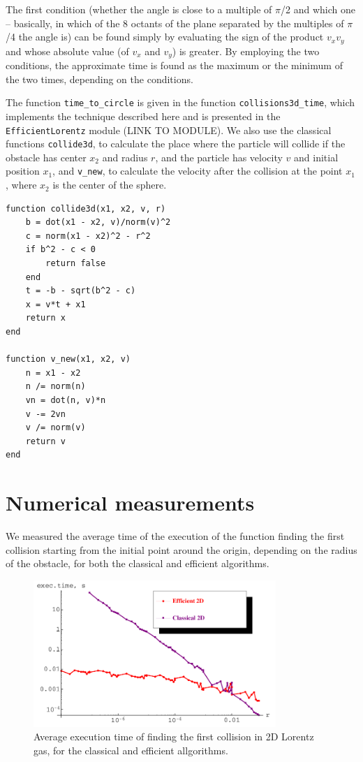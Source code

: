 \documentclass[prl,amsmath,amssymb, twocolumn, showpacs]{revtex4-1}
\begin{document}
The first condition (whether the angle is close to a multiple of $\pi$/2 and which one – basically, in which of the 8 octants of the plane separated by the multiples of $\pi$/4 the angle is) can be found simply by evaluating the sign of the product $v_x v_y$ and whose absolute value (of $v_x$ and $v_y$) is greater. By employing the two conditions, the approximate time is found as the maximum or the minimum of the two times, depending on the conditions.

The function \texttt{time\_to\_circle} is given in the function \texttt{collisions3d\_time}, which implements the technique described here and is presented in the \texttt{EfficientLorentz} module (LINK TO MODULE). We also use the classical functions \texttt{collide3d}, to calculate the place where the particle will collide if the obstacle has center $x_2$ and radius $r$, and the particle has velocity $v$ and initial position $x_1$, and \texttt{v\_new}, to calculate the velocity after the collision at the point $x_1$, where $x_2$ is the center of the sphere.

\begin{verbatim}
function collide3d(x1, x2, v, r) 
    b = dot(x1 - x2, v)/norm(v)^2 
    c = norm(x1 - x2)^2 - r^2 
    if b^2 - c < 0
        return false 
    end 
    t = -b - sqrt(b^2 - c) 
    x = v*t + x1 
    return x 
end 

function v_new(x1, x2, v) 
    n = x1 - x2 
    n /= norm(n) 
    vn = dot(n, v)*n 
    v -= 2vn 
    v /= norm(v) 
    return v 
end
\end{verbatim}

\section{Numerical measurements}

We measured the average time of the execution of the function finding the first collision starting from the initial point around the origin, depending on the radius of the obstacle, for both the classical and efficient algorithms.

\begin{figure}
\centering
\includegraphics [width=260pt]{fig05.png}
\caption{Average execution time of finding the first collision in 2D Lorentz gas, for the classical and efficient allgorithms.}
\label{fig:fig05}
\end{figure}
\end{document}
